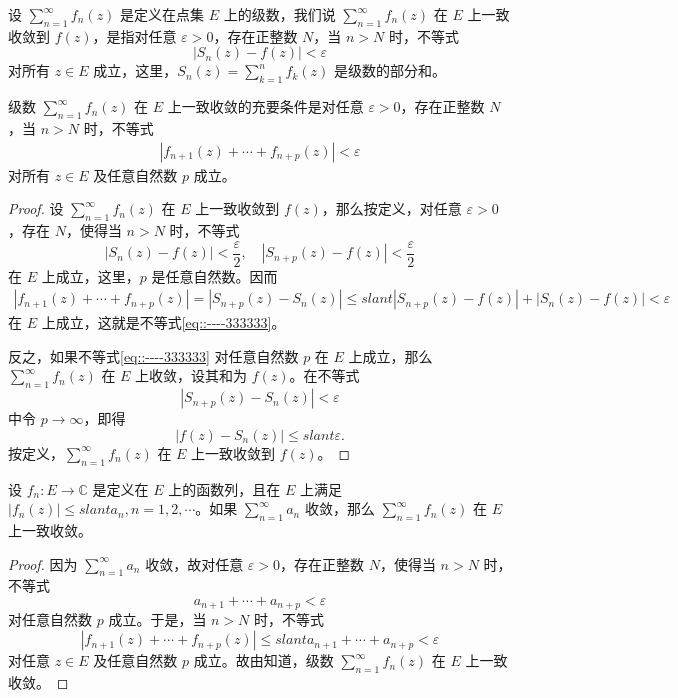\documentclass[../../main.tex]{subfiles}
\begin{document}
\begin{definition}
设 \( \sum_{n=1}^{\infty} f_n(z) \) 是定义在点集 \( E \) 上的级数，我们说 \( \sum_{n=1}^{\infty} f_n(z) \) 在 \( E \) 上一致收敛到 \( f(z) \)，是指对任意 \( \varepsilon > 0 \)，存在正整数 \( N \)，当 \( n > N \) 时，不等式
\[
|S_n(z) - f(z)| < \varepsilon
\]
对所有 \( z \in E \) 成立，这里，\( S_n(z) = \sum_{k=1}^{n} f_k(z) \) 是级数的部分和。
\end{definition}

\begin{theorem}\label{theorem:定理4.1.2}
级数 \( \sum_{n=1}^{\infty} f_n(z) \) 在 \( E \) 上一致收敛的充要条件是对任意 \( \varepsilon > 0 \)，存在正整数 \( N \)，当 \( n > N \) 时，不等式
\begin{align}
|f_{n + 1}(z) + \cdots + f_{n + p}(z)| < \varepsilon\label{eq::----333333}
\end{align}
对所有 \( z \in E \) 及任意自然数 \( p \) 成立。
\end{theorem}
\begin{proof}
设 \( \sum_{n=1}^{\infty} f_n(z) \) 在 \( E \) 上一致收敛到 \( f(z) \)，那么按定义，对任意 \( \varepsilon > 0 \)，存在 \( N \)，使得当 \( n > N \) 时，不等式
\[
|S_n(z) - f(z)| < \frac{\varepsilon}{2},
\quad
|S_{n + p}(z) - f(z)| < \frac{\varepsilon}{2}
\]
在 \( E \) 上成立，这里，\( p \) 是任意自然数。因而
\begin{align*}
|f_{n + 1}(z) + \cdots + f_{n + p}(z)| = |S_{n + p}(z) - S_n(z)| \leqslant slant |S_{n + p}(z) - f(z)| + |S_n(z) - f(z)| < \varepsilon
\end{align*}
在 \( E \) 上成立，这就是不等式\eqref{eq::----333333}。

反之，如果不等式\eqref{eq::----333333} 对任意自然数 \( p \) 在 \( E \) 上成立，那么 \( \sum_{n=1}^{\infty} f_n(z) \) 在 \( E \) 上收敛，设其和为 \( f(z) \)。在不等式
\[
|S_{n + p}(z) - S_n(z)| < \varepsilon
\]
中令 \( p \to \infty \)，即得
\[
|f(z) - S_n(z)| \leqslant slant \varepsilon.
\]
按定义，\( \sum_{n=1}^{\infty} f_n(z) \) 在 \( E \) 上一致收敛到 \( f(z) \)。
\end{proof}

\begin{theorem}[Weierstrass一致收敛判别法]\label{theorem:Weierstrass一致收敛判别法}
设 \( f_n: E \to \mathbb{C} \) 是定义在 \( E \) 上的函数列，且在 \( E \) 上满足 \( |f_n(z)| \leqslant slant a_n, n = 1, 2, \cdots \)。如果 \( \sum_{n=1}^{\infty} a_n \) 收敛，那么 \( \sum_{n=1}^{\infty} f_n(z) \) 在 \( E \) 上一致收敛。
\end{theorem}
\begin{proof}
因为 \( \sum_{n=1}^{\infty} a_n \) 收敛，故对任意 \( \varepsilon > 0 \)，存在正整数 \( N \)，使得当 \( n > N \) 时，不等式
\[
a_{n + 1} + \cdots + a_{n + p} < \varepsilon
\]
对任意自然数 \( p \) 成立。于是，当 \( n > N \) 时，不等式
\[
|f_{n + 1}(z) + \cdots + f_{n + p}(z)| \leqslant slant a_{n + 1} + \cdots + a_{n + p}
< \varepsilon
\]
对任意 \( z \in E \) 及任意自然数 \( p \) 成立。故由知道，级数 \( \sum_{n=1}^{\infty} f_n(z) \) 在 \( E \) 上一致收敛。
\end{proof}
\end{document}
